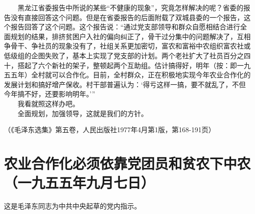 \documentclass[cn,11pt,chinese]{elegantbook}
\def\myformat#1{\hfil\hfil #1}
\begin{document}
　　黑龙江省委报告中所说的某些“不健康的现象”，究竟怎样解决的呢？省委的报告没有直接回答这个问题。但是在省委报告的后面附载了双城县委的一个报告，这个报告回答了这个问题。这个报告说：“通过党支部领导和群众自愿相结合进行全面规划的结果，排挤贫困户入社的偏向纠正了，骨干过分集中的问题解决了，互相争骨干、争社员的现象没有了，社组关系更加密切，富农和富裕中农组织富农社或低级组的企图失败了，基本上实现了党支部的计划。两个老社扩大了社员百分之四十，搭起了六个新社的架子，整顿起两个互助组。估计搞得好，明年（按：即一九五五年）全村就可以合作化。目前，全村群众，正在积极地实现今年农业合作化的发展计划和搞好增产保收。村干部普遍认为：‘得亏这样一搞，要不就乱了，不但今年搞不好，还要影响明年。’”\\
　　我看就照这样办吧。\\
　　全面规划，加强领导，这就是我们的方针。\\
\begin{flushright}（《毛泽东选集》第五卷，人民出版社1977年4月第1版，第168-191页）\end{flushright}
\newpage\section*{\myformat{农业合作化必须依靠党团员和贫农下中农}\\\myformat{（一九五五年九月七日）}}
\begin{introduction}\item  这是毛泽东同志为中共中央起草的党内指示。\end{introduction}
\end{document}
